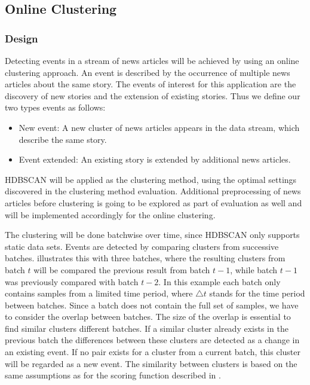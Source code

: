 \subsection{Online Clustering}
\label{subsec:4c_online_clustering}

\subsubsection{Design}
\label{subsubsec:4c_design}

Detecting events in a stream of news articles will be achieved by using an online clustering approach.
An event is described by the occurrence of multiple news articles about the same story.
The events of interest for this application are the discovery of new stories and the extension of existing stories.
Thus we define our two types events as follows:

\begin{itemize}
    \item New event: A new cluster of news articles appears in the data stream, which describe the same story.
    \item Event extended: An existing story is extended by additional news articles.
\end{itemize}

HDBSCAN will be applied as the clustering method,
using the optimal settings discovered in the clustering method evaluation.
Additional preprocessing of news articles before clustering is going to be explored
as part of evaluation as well and will be implemented accordingly for the online clustering.

The clustering will be done batchwise over time, since HDBSCAN only supports static data sets.
Events are detected by comparing clusters from successive batches.
 illustrates this with three batches,
where the resulting clusters from batch $t$ will be compared the previous result from batch $t - 1$,
while batch $t - 1$ was previously compared with batch $t - 2$.
In this example each batch only contains samples from a limited time period,
where $\triangle t$ stands for the time period between batches.
Since a batch does not contain the full set of samples, we have to consider the overlap between batches.
The size of the overlap is essential to find similar clusters different batches.
If a similar cluster already exists in the previous batch
the differences between these clusters are detected as a change in an existing event.
If no pair exists for a cluster from a current batch, this cluster will be regarded as a new event.
The similarity between clusters is based on the same assumptions
as for the scoring function described in .

